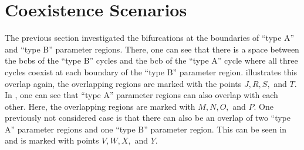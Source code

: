 \section{Coexistence Scenarios}
\label{sec:arch.coex}

The previous section investigated the bifurcations at the boundaries of ``type A'' and ``type B'' parameter regions.
There, one can see that there is a space between the \glspl{bcb} of the ``type B'' cycles and the \gls{bcb} of the ``type A'' cycle where all three cycles coexist at each boundary of the ``type B'' parameter region.
 illustrates this overlap again, the overlapping regions are marked with the points $J, R, S,$ and $T$.
In , one can see that ``type A'' parameter regions can also overlap with each other.
Here, the overlapping regions are marked with $M, N, O,$ and $P$.
One previously not considered case is that there can also be an overlap of two ``type A'' parameter regions and one ``type B'' parameter region.
This can be seen in  and is marked with points $V, W, X,$ and $Y$.

